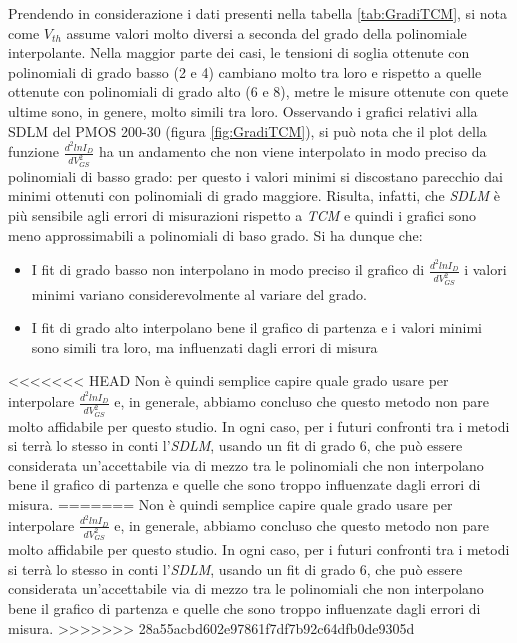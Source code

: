 \documentclass[12pt, letterpaper]{book}
\begin{document}
Prendendo in considerazione i dati presenti nella tabella \ref{tab:GradiTCM}, si nota come $V_{th}$ assume valori molto diversi a seconda del grado della polinomiale interpolante. Nella maggior parte dei casi, le tensioni di soglia ottenute con polinomiali di grado basso (2 e 4) cambiano molto tra loro e rispetto a quelle ottenute con polinomiali di grado alto (6 e 8), metre le misure ottenute con quete ultime sono, in genere, molto simili tra loro. Osservando i grafici relativi alla SDLM del PMOS 200-30 (figura \ref{fig:GradiTCM}), si può nota che il plot della funzione $\frac{d^2lnI_D}{dV_{GS}^2}$ ha un andamento che non viene interpolato in modo preciso da polinomiali di basso grado: per questo i valori minimi si discostano parecchio dai minimi ottenuti con polinomiali di grado maggiore. Risulta, infatti, che \emph{SDLM} è più sensibile agli errori di misurazioni rispetto a \emph{TCM} e quindi i grafici sono meno approssimabili a polinomiali di baso grado. Si ha dunque che:
\begin{itemize}
  \item I fit di grado basso non interpolano in modo preciso il grafico di $\frac{d^2lnI_D}{dV_{GS}^2}$ i valori minimi variano considerevolmente al variare del grado.
  \item I fit di grado alto interpolano bene il grafico di partenza e i valori minimi sono simili tra loro, ma influenzati dagli errori di misura
\end{itemize}

<<<<<<< HEAD
Non è quindi semplice capire quale grado usare per interpolare $\frac{d^2lnI_D}{dV_{GS}^2}$ e, in generale, abbiamo concluso che questo metodo non pare molto affidabile per questo studio. In ogni caso, per i futuri confronti tra i metodi si terrà lo stesso in conti l'\emph{SDLM}, usando un fit di grado 6, che può essere considerata un'accettabile via di mezzo tra le polinomiali che non interpolano bene il grafico di partenza e quelle che sono troppo influenzate dagli errori di misura. 
=======
Non è quindi semplice capire quale grado usare per interpolare $\frac{d^2lnI_D}{dV_{GS}^2}$ e, in generale, abbiamo concluso che questo metodo non pare molto affidabile per questo studio. In ogni caso, per i futuri confronti tra i metodi si terrà lo stesso in conti l'\emph{SDLM}, usando un fit di grado 6, che può essere considerata un'accettabile via di mezzo tra le polinomiali che non interpolano bene il grafico di partenza e quelle che sono troppo influenzate dagli errori di misura.
>>>>>>> 28a55acbd602e97861f7df7b92c64dfb0de9305d
\end{document}
